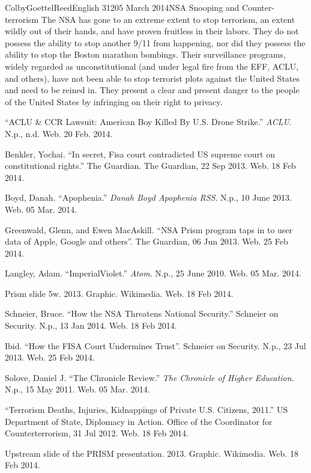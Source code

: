 \documentclass[12pt]{article}
\begin{document}
\begin{mla}{Colby}{Goettel}{Reed}{English 312}{05 March 2014}{NSA Snooping and Counter-terrorism}
The NSA has gone to an extreme extent to stop terrorism, an extent wildly out of their hands, and have proven fruitless in their labors. They do not possess the ability to stop another 9/11 from happening, nor did they possess the ability to stop the Boston marathon bombings. Their surveillance programs, widely regarded as unconstitutional (and under legal fire from the EFF, ACLU, and others), have not been able to stop terrorist plots against the United States and need to be reined in. They present a clear and present danger to the people of the United States by infringing on their right to privacy.

\begin{workscited}
    \bibent ``ACLU \& CCR Lawsuit: American Boy Killed By U.S. Drone Strike.'' \textit{ACLU}. N.p., n.d. Web. 20 Feb. 2014.
    
    \bibent Benkler, Yochai. ``In secret, Fisa court contradicted US supreme court on constitutional rights.'' The Guardian. The Guardian, 22 Sep 2013. Web. 18 Feb 2014.
    
    \bibent Boyd, Danah. ``Apophenia.'' \textit{Danah Boyd Apophenia RSS}. N.p., 10 June 2013. Web. 05 Mar. 2014.
    
    \bibent Greenwald, Glenn, and Ewen MacAskill. ``NSA Prism program taps in to user data of Apple, Google and others''. The Guardian, 06 Jun 2013. Web. 25 Feb 2014.
    
    \bibent Langley, Adam. ``ImperialViolet.'' \textit{Atom}. N.p., 25 June 2010. Web. 05 Mar. 2014.
    
    \bibent Prism slide 5w. 2013. Graphic. Wikimedia. Web. 18 Feb 2014.
    
    \bibent Schneier, Bruce. ``How the NSA Threatens National Security.'' Schneier on Security. N.p., 13 Jan 2014. Web. 18 Feb 2014.
    
    \bibent Ibid. ``How the FISA Court Undermines Trust''. Schneier on Security. N.p., 23 Jul 2013. Web. 25 Feb 2014.
    
    \bibent Solove, Daniel J. ``The Chronicle Review.'' \textit{The Chronicle of Higher Education}. N.p., 15 May 2011. Web. 05 Mar. 2014.
    
    \bibent ``Terrorism Deaths, Injuries, Kidnappings of Private U.S. Citizens, 2011.'' US Department of State, Diplomacy in Action. Office of the Coordinator for Counterterrorism, 31 Jul 2012. Web. 18 Feb 2014.
    
    \bibent Upstream slide of the PRISM presentation. 2013. Graphic. Wikimedia. Web. 18 Feb 2014.
\end{workscited}

\end{mla}
\end{document}
